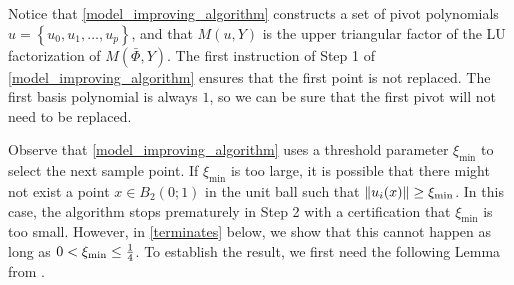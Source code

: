 \documentclass{article}
\begin{document}

%
%
%
%


Notice that \cref{model_improving_algorithm} constructs a set of pivot polynomials $u = \left\{u_0, u_1, \ldots, u_p\right\}$,
and that $M(u, Y)$ is the upper triangular factor of the LU factorization of $M(\bar \Phi, Y)$.
The first instruction of Step 1 of \cref{model_improving_algorithm} ensures that the first point is not replaced.
The first basis polynomial is always $1$, so we can be sure that the first pivot will not need to be replaced.

Observe that \cref{model_improving_algorithm} uses a threshold parameter $\xi_{\min}$ to select the next sample point.
If $\xi_{\min}$ is too large, it is possible that there might not exist a point $x \in B_2(0;1)$ 
in the unit ball such that $\|u_i(x)\| \ge \xi_{\text{min}}$.
In this case, the algorithm stops prematurely in Step 2 with a certification that $\xi_{\min}$ is too small.
However,  in \cref{terminates} below, we show that this cannot happen as long as $0 < \xi_{\text{min}} \le \frac 1 4$.
To establish the result, we first need the following Lemma from \cite{introduction_book}.
\end{document}
